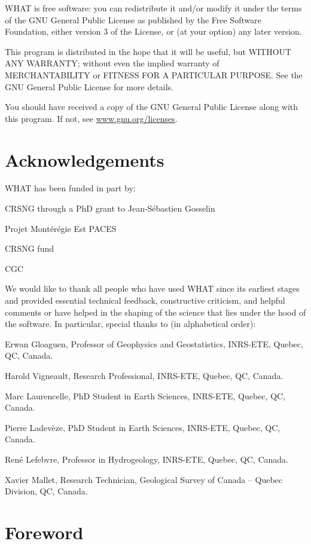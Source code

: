 \documentclass[WHATMANUAL.tex]{subfiles}
\begin{document}
WHAT is free software: you can redistribute it and/or modify it under the terms of the GNU General Public License as published by the Free Software Foundation, either version 3 of the License, or (at your option) any later version.

This program is distributed in the hope that it will be useful, but WITHOUT ANY WARRANTY; without even the implied warranty of MERCHANTABILITY or FITNESS FOR A PARTICULAR PURPOSE. See the GNU General Public License for more details.

You should have received a copy of the GNU General Public License along with this program. If not, see \url{www.gnu.org/licenses}.

\chapter*{Acknowledgements}

WHAT has been funded in part by:

\begin{description}
\item CRSNG through a PhD grant to Jean-S\'ebastien Gosselin
\item Projet Montérégie Est PACES
\item CRSNG fund
\item CGC
\end{description}

We would like to thank all people who have used WHAT since its earliest stages and provided essential technical feedback, constructive criticism, and helpful comments or have helped in the shaping of the science that lies under the hood of the software. In particular, special thanks to (in alphabetical order):

\begin{description}
\item Erwan Gloaguen, Professor of Geophysics and Geostatistics, INRS-ETE, Quebec, QC, Canada.
\item Harold Vigneault, Research Professional, INRS-ETE, Quebec, QC, Canada.
\item Marc Laurencelle, PhD Student in Earth Sciences, INRS-ETE, Quebec, QC, Canada.
\item Pierre Ladev\`eze, PhD Student in Earth Sciences, INRS-ETE, Quebec, QC, Canada.
\item Ren\'e Lefebvre, Professor in Hydrogeology, INRS-ETE, Quebec, QC, Canada.
\item Xavier Mallet, Research Technician, Geological Survey of Canada – Quebec Division, QC, Canada.
\end{description}

\chapter*{Foreword}
\end{document}
